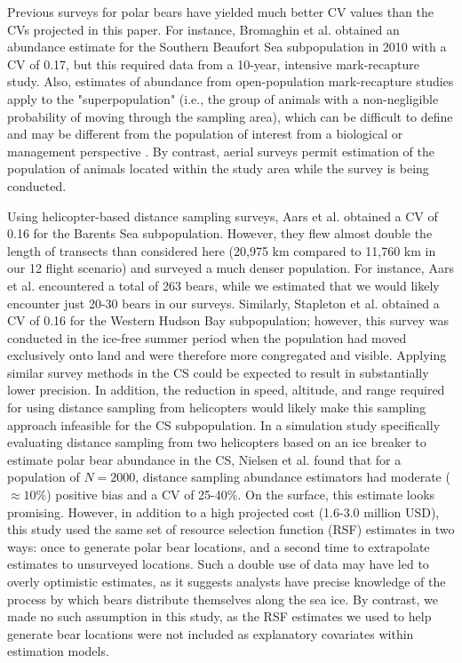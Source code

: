 \documentclass[]{rsos}%
\begin{document}
Previous surveys for polar bears have yielded much better CV values than the CVs projected in this paper.  For instance, Bromaghin et al. \cite{BromaghinEtAl2015} obtained an abundance estimate for the Southern Beaufort Sea subpopulation in 2010 with a CV of 0.17, but this required data from a 10-year, intensive mark-recapture study. Also, estimates of abundance from open-population mark-recapture studies apply to the "superpopulation" (i.e., the group of animals with a non-negligible probability of moving through the sampling area), which can be difficult to define and may be different from the population of interest from a biological or management perspective \cite{LunnEtAlInPress}.  By contrast, aerial surveys permit estimation of the population of animals located within the study area while the survey is being conducted.

Using helicopter-based distance sampling surveys, Aars et al. \cite{AarsEtAl2009} obtained a CV of 0.16 for the Barents Sea subpopulation.  However, they flew almost double the length of transects than considered here (20,975 km compared to 11,760 km in our 12 flight scenario) and surveyed a much denser population.  For instance, Aars et al. \cite{AarsEtAl2009} encountered a total of 263 bears, while we estimated that we would likely encounter just 20-30 bears in our surveys.  Similarly, Stapleton et al. \cite{StapletonEtAl2014} obtained a CV of 0.16 for the Western Hudson Bay subpopulation; however, this survey was conducted in the ice-free summer period when the population had moved exclusively onto land and were therefore more congregated and visible.  Applying similar survey methods in the CS could be expected to result in substantially lower precision. In addition, the reduction in speed, altitude, and range required for using distance sampling from helicopters would likely make this sampling approach infeasible for the CS subpopulation. In a simulation study specifically evaluating distance sampling from two helicopters based on an ice breaker to estimate polar bear abundance in the CS, Nielsen et al. \cite{NielsenEtAl2013} found that for a population of $N=2000$, distance sampling abundance estimators had moderate ($\approx 10\%$) positive bias and a CV of 25-40\%.  On the surface, this estimate looks promising.  However, in addition to a high projected cost (1.6-3.0 million USD), this study used the same set of resource selection function (RSF) estimates in two ways: once to generate polar bear locations, and a second time to extrapolate estimates to unsurveyed locations. Such a double use of data may have led to overly optimistic estimates, as it suggests analysts have precise knowledge of the process by which bears distribute themselves along the sea ice.  By contrast, we made no such assumption in this study, as the RSF estimates we used to help generate bear locations were not included as explanatory covariates within estimation models.
\end{document}
